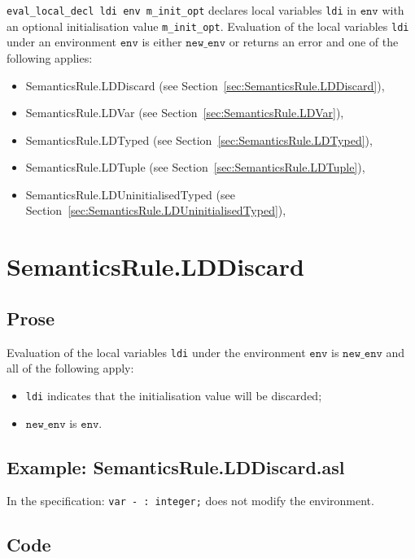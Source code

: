 \documentclass{book}
\newcommand\newenv[0]{\texttt{new\_env}}
\newcommand\env[0]{\texttt{env}}
\begin{document}
\texttt{eval\_local\_decl ldi env m\_init\_opt} declares local variables
\texttt{ldi} in $\env$ with an optional initialisation value
\texttt{m\_init\_opt}.  Evaluation of the local variables \texttt{ldi}
under an environment $\env$ is either $\newenv$ or returns an
error and one of the following applies:
\begin{itemize}
  \item SemanticsRule.LDDiscard (see Section~\ref{sec:SemanticsRule.LDDiscard}),
  \item SemanticsRule.LDVar (see Section~\ref{sec:SemanticsRule.LDVar}),
  \item SemanticsRule.LDTyped (see Section~\ref{sec:SemanticsRule.LDTyped}),
  \item SemanticsRule.LDTuple (see Section~\ref{sec:SemanticsRule.LDTuple}),
  \item SemanticsRule.LDUninitialisedTyped (see Section~\ref{sec:SemanticsRule.LDUninitialisedTyped}),
\end{itemize}

\section{SemanticsRule.LDDiscard \label{sec:SemanticsRule.LDDiscard}}

    \subsection{Prose}
Evaluation of the local variables \texttt{ldi} under the environment
$\env$ is $\newenv$ and all of the following apply:
    \begin{itemize}
    \item \texttt{ldi} indicates that the initialisation value will be discarded;
    \item $\newenv$ is $\env$.
    \end{itemize}

    \subsection{Example: SemanticsRule.LDDiscard.asl}
    In the specification:
    \texttt{var - : integer;} does not modify the environment.

  \subsection{Code}
\end{document}

